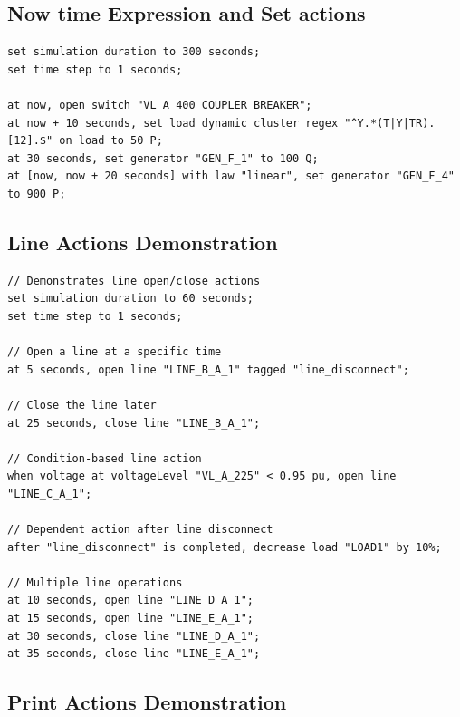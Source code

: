 \documentclass[12pt]{article}
\begin{document}
\subsection{Now time Expression and Set actions}

\begin{lstlisting}
set simulation duration to 300 seconds;
set time step to 1 seconds;

at now, open switch "VL_A_400_COUPLER_BREAKER";
at now + 10 seconds, set load dynamic cluster regex "^Y.*(T|Y|TR).[12].$" on load to 50 P;
at 30 seconds, set generator "GEN_F_1" to 100 Q;
at [now, now + 20 seconds] with law "linear", set generator "GEN_F_4" to 900 P;
\end{lstlisting}

\subsection{Line Actions Demonstration}

\begin{lstlisting}
// Demonstrates line open/close actions
set simulation duration to 60 seconds;
set time step to 1 seconds;

// Open a line at a specific time
at 5 seconds, open line "LINE_B_A_1" tagged "line_disconnect";

// Close the line later
at 25 seconds, close line "LINE_B_A_1";

// Condition-based line action
when voltage at voltageLevel "VL_A_225" < 0.95 pu, open line "LINE_C_A_1";

// Dependent action after line disconnect
after "line_disconnect" is completed, decrease load "LOAD1" by 10%;

// Multiple line operations
at 10 seconds, open line "LINE_D_A_1";
at 15 seconds, open line "LINE_E_A_1";
at 30 seconds, close line "LINE_D_A_1";
at 35 seconds, close line "LINE_E_A_1";
\end{lstlisting}

\subsection{Print Actions Demonstration}
\end{document}
